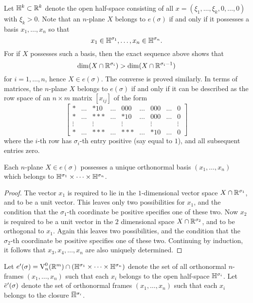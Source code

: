 \documentclass[../main]{subfiles}
\begin{document}
Let $\mathbb{H}^{k} \subset \mathbb R^{k}$ denote the open half-space consisting of all $x= (\xi_{1},\dots, \xi_{k}, 0,\dots, 0)$ with $\xi_{k}>0 $. Note that an $n$-plane $X$ belongs to $e(\sigma)$ if and only if it possesses a basis $x_{1},\dots, x_{n}$ so that
\[
x_{1} \in \mathbb{H}^{\sigma_{1}},\dots, x_{n} \in \mathbb{H}^{\sigma_{n}}.
\]
For if $X$ possesses such a basis, then the exact sequence above shows that
\[
\dim(X \cap \mathbb R^{\sigma_{i}})>\dim(X \cap \mathbb R^{\sigma_{i}-1})
\]
for $i=1,\dots, n$, hence $X \in e(\sigma) $. The converse is proved similarly. In terms of matrices, the $n$-plane $X$ belongs to $e(\sigma)$ if and only if it can be described as the row space of an $n \times m$ matrix $[x_{ij}]$ of the form
\[\begin{bmatrix}
	* & \dots & *10 & \dots & 000 & \dots & 000 & \dots & 0 \\
	* & \dots & *** & \dots & *10 & \dots & 000 & \dots & 0 \\
	\vdots &  & \vdots &  & \vdots &  & \vdots &  & \vdots \\
	* & \dots & *** & \dots & *** & \dots & *10 & \dots & 0
\end{bmatrix}\]
where the $i$-th row has $\sigma_{i}$-th entry positive (say equal to $1$), and all subsequent entries zero.
\setcounter{theorem}{1}
\begin{lemma}
\label{lem:06.02}
Each $n$-plane $X \in e(\sigma)$ possesses a unique orthonormal basis $(x_{1},\dots, x_{n})$ which belongs to $\mathbb{H}^{\sigma_{1}} \times\dots \times \mathbb{H}^{\sigma_{n}}$.
\end{lemma}
\begin{proof}
The vector $x_{1}$ is required to lie in the $1$-dimensional vector space $X \cap \mathbb R^{\sigma_{1}}$, and to be a unit vector. This leaves only two possibilities for $x_{1}$, and the condition that the $\sigma_{1}$-th coordinate be positive specifies one of these two. Now $x_{2}$ is required to be a unit vector in the $2$ dimensional space $X\cap\mathbb R^{\sigma_{2}}$, and to be orthogonal to $x_{1} $. Again this leaves two possibilities, and the condition that the $\sigma_{2}$-th coordinate be positive specifies one of these two. Continuing by induction, it follows that $x_{3}, x_{4},\dots, x_{n}$ are also uniquely determined.
\end{proof}

\begin{definition}
\label{def:06.02}
Let $e^{\prime}(\sigma)=\operatorname{V}_{n}^{0}(\mathbb R^m) \cap(\mathbb{H}^{\sigma_{1}} \times\dots \times \mathbb{H}^{\sigma_{n}})$ denote the set of all orthonormal $n$-frames $(x_{1},\dots, x_{n})$ such that each $x_{i}$ belongs to the open half-space $\mathbb{H}^{\sigma_i}$. Let $\xoverline{e}^{\prime}(\sigma)$ denote the set of orthonormal frames $(x_{1},\dots, x_{n})$ such that each $x_{i}$ belongs to the closure $\xoverline{\halfspace}^{\sigma_{i}}$.
\end{definition}
\end{document}
